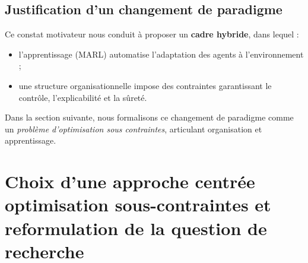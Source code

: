 \documentclass[ twoside,openright,titlepage,numbers=noenddot,headinclude,%
                footinclude=true,cleardoublepage=empty,abstractoff, %
                BCOR=5mm,paper=a4,fontsize=11pt,%
                french,american,%
                ]{scrreprt}
\begin{document}
\subsection{Justification d'un changement de paradigme}

Ce constat motivateur nous conduit à proposer un \textbf{cadre hybride}, dans lequel :
\begin{itemize}
    \item l'apprentissage (MARL) automatise l'adaptation des agents à l'environnement ;
    \item une structure organisationnelle impose des contraintes garantissant le contrôle, l'explicabilité et la sûreté.
\end{itemize}

Dans la section suivante, nous formalisons ce changement de paradigme comme un \textit{problème d'optimisation sous contraintes}, articulant organisation et apprentissage.


\section{Choix d'une approche centrée optimisation sous-contraintes et reformulation de la question de recherche}\label{sec:constrained-formulation}
\end{document}
